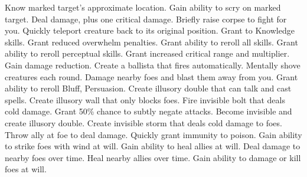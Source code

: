     {Know marked target's approximate location.}
    {Gain ability to scry on marked target.}
    {Deal damage, plus one critical damage.}
    {Briefly raise corpse to fight for you.}
    {Quickly teleport creature back to its original position.}
    {Grant  to Knowledge skills.}
    {Grant reduced overwhelm penalties.}
    {Grant ability to reroll all skills.}
    {Grant ability to reroll perceptual skills.}
    {Grant increased critical range and multiplier.}
    {Gain damage reduction.}
    {Create a ballista that fires automatically.}
    {Mentally shove creatures each round.}
    {Damage nearby foes and blast them away from you.}
    {Grant ability to reroll Bluff, Persuasion.}
    {Create illusory double that can talk and cast spells.}
    {Create illusory wall that only blocks foes.}
    {Fire invisible bolt that deals cold damage.}
    {Grant 50\% chance to subtly negate attacks.}
    {Become invisible and create illusory double.}
    {Create invisible storm that deals cold damage to foes.}
    {Throw ally at foe to deal damage.}
    {Quickly grant immunity to poison.}
    {Gain ability to strike foes with wind at will.}
    {Gain ability to heal allies at will.}
    {Deal damage to nearby foes over time.}
    {Heal nearby allies over time.}
    {Gain ability to damage or kill foes at will.}
